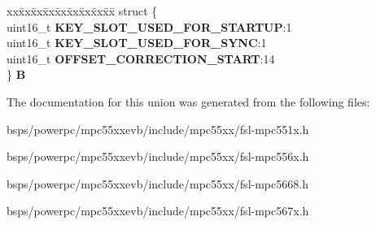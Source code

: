 \begin{DoxyCompactItemize}
\begin{tabbing}
\end{tabbing}\item 
\mbox{\label{unionuPCR11_a730c7c18a2a132a0968797ef231f2a20}} 
\begin{tabbing}
xx\=xx\=xx\=xx\=xx\=xx\=xx\=xx\=xx\=\kill
struct \{\\
\>uint16\_t {\bfseries KEY\_SLOT\_USED\_FOR\_STARTUP}:1\\
\>uint16\_t {\bfseries KEY\_SLOT\_USED\_FOR\_SYNC}:1\\
\>uint16\_t {\bfseries OFFSET\_CORRECTION\_START}:14\\
\} {\bfseries B}\\

\end{tabbing}\end{DoxyCompactItemize}


The documentation for this union was generated from the following files\+:\begin{DoxyCompactItemize}
\item 
bsps/powerpc/mpc55xxevb/include/mpc55xx/fsl-\/mpc551x.\+h\item 
bsps/powerpc/mpc55xxevb/include/mpc55xx/fsl-\/mpc556x.\+h\item 
bsps/powerpc/mpc55xxevb/include/mpc55xx/fsl-\/mpc5668.\+h\item 
bsps/powerpc/mpc55xxevb/include/mpc55xx/fsl-\/mpc567x.\+h\end{DoxyCompactItemize}

